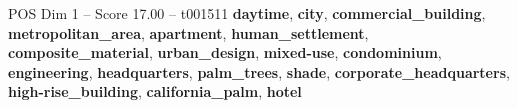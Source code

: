 \begin{textsample}{POS Dim 1 – Score 17.00 – t001511}  \label{ex:f1_pos_034}
\textbf{daytime}, \textbf{city}, \textbf{commercial\_building}, \textbf{metropolitan\_area}, \textbf{apartment}, \textbf{human\_settlement}, \textbf{composite\_material}, \textbf{urban\_design}, \textbf{mixed-use}, \textbf{condominium}, \textbf{engineering}, \textbf{headquarters}, \textbf{palm\_trees}, \textbf{shade}, \textbf{corporate\_headquarters}, \textbf{high-rise\_building}, \textbf{california\_palm}, \textbf{hotel}

\end{textsample}
